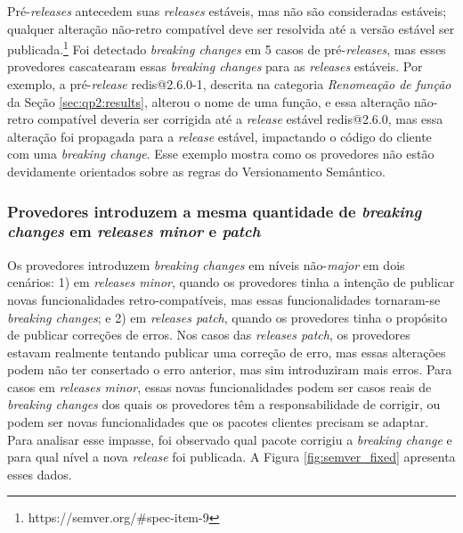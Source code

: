 Pré-\textit{releases} antecedem suas \textit{releases} estáveis, mas não são consideradas estáveis; qualquer alteração não-retro compatível deve ser resolvida até a versão estável ser publicada.\footnote{https://semver.org/\#spec-item-9} Foi detectado \textit{breaking changes} em 5 casos de pré-\textit{releases}, mas esses provedores cascatearam essas \textit{breaking changes} para as \textit{releases} estáveis. Por exemplo, a pré-\textit{release} \textsf{redis@2.6.0-1}, descrita na categoria \textit{Renomeação de função} da Seção \ref{sec:qp2:results}, alterou o nome de uma função, e essa alteração não-retro compatível deveria ser corrigida até a \textit{release} estável \textsf{redis@2.6.0}, mas essa alteração foi propagada para a \textit{release} estável, impactando o código do cliente com uma \textit{breaking change}. Esse exemplo mostra como os provedores não estão devidamente orientados sobre as regras do Versionamento Semântico.

\subsubsection{Provedores introduzem a mesma quantidade de \textit{breaking changes} em \textit{releases minor} e \textit{patch}}

Os provedores introduzem \textit{breaking changes} em níveis não-\textit{major} em dois cenários: 1) em \textit{releases minor}, quando os provedores tinha a intenção de publicar novas funcionalidades retro-compatíveis, mas essas funcionalidades tornaram-se \textit{breaking changes}; e 2) em \textit{releases patch}, quando os provedores tinha o propósito de publicar correções de erros. Nos casos das \textit{releases patch}, os provedores estavam realmente tentando publicar uma correção de erro, mas essas alterações podem não ter consertado o erro anterior, mas sim introduziram mais erros. Para casos em \textit{releases minor}, essas novas funcionalidades podem ser casos reais de \textit{breaking changes} dos quais os provedores têm a responsabilidade de corrigir, ou podem ser novas funcionalidades que os pacotes clientes precisam se adaptar. Para analisar esse impasse, foi observado qual pacote corrigiu a \textit{breaking change} e para qual nível a nova \textit{release} foi publicada. A Figura \ref{fig:semver_fixed} apresenta esses dados.

